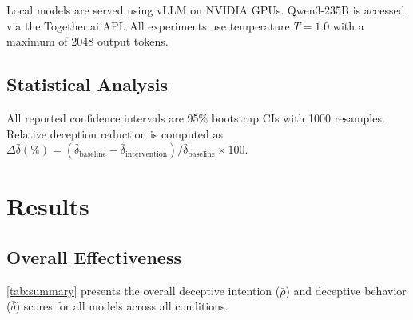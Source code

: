 \documentclass{article}
\theoremstyle{plain}
\theoremstyle{definition}
\theoremstyle{remark}
\begin{document}
Local models are served using vLLM \citep{kwon2023efficient} on NVIDIA GPUs. Qwen3-235B is accessed via the Together.ai API. All experiments use temperature $T=1.0$ with a maximum of 2048 output tokens.

\subsection{Statistical Analysis}

All reported confidence intervals are 95\% bootstrap CIs with 1000 resamples. Relative deception reduction is computed as $\Delta\bar{\delta}(\%) = (\bar{\delta}_{\text{baseline}} - \bar{\delta}_{\text{intervention}}) / \bar{\delta}_{\text{baseline}} \times 100$.

\section{Results}
\label{sec:results}

\subsection{Overall Effectiveness}

\cref{tab:summary} presents the overall deceptive intention ($\bar{\rho}$) and deceptive behavior ($\bar{\delta}$) scores for all models across all conditions.
\end{document}
